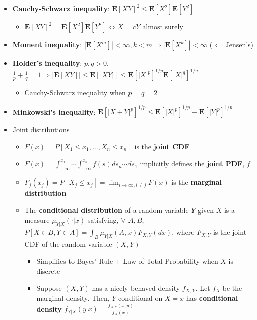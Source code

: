 \documentclass[12pt,english]{article}
\begin{document}
\begin{itemize}
	\item \textbf{Cauchy-Schwarz inequality}: $\mathbf{E}[XY]^{2} \leq \mathbf{E}[X^{2}] \mathbf{E}[Y^{2}]$ 
	\begin{itemize}
		\item $\mathbf{E}[XY]^{2} = \mathbf{E}[X^{2}] \mathbf{E}[Y^{2}] \Leftrightarrow X = cY \text{ almost surely}$
	\end{itemize}
	\item \textbf{Moment inequality}: $|\mathbf{E}[X^{m}]| < \infty, k < m \Rightarrow |\mathbf{E}[X^{k}]| < \infty$ ($\Leftarrow$ Jensen's)
	\item \textbf{Holder's inequality}: $p, q > 0$, $\frac{1}{p} + \frac{1}{q} = 1 \Rightarrow |\mathbf{E}[XY]| \leq \mathbf{E}[|XY|] \leq \mathbf{E}[|X|^{p}]^{1/p} \mathbf{E}[|X|^{q}]^{1/q}$
	\begin{itemize}
		\item Cauchy-Schwarz inequality when $p = q = 2$
	\end{itemize}
	\item \textbf{Minkowski's inequality}: $\mathbf{E}[|X + Y|^{p}]^{1/p} \leq \mathbf{E}[|X|^{p}]^{1/p} + \mathbf{E}[|Y|^{p}]^{1/p}$
	\item Joint distributions
	\begin{itemize}
		\item $F(x) = P[X_{1} \leq x_{1}, \ldots, X_{n} \leq x_{n}]$ is the \textbf{joint CDF}
		\item $F(x) = \int_{-\infty}^{x_{1}} \cdots \int_{-\infty}^{x_{n}} f(s) ds_{n} \cdots ds_{1}$ implicitly defines the \textbf{joint PDF}, $f$
		\item $F_{j}(x_{j}) = P[X_{j} \leq x_{j}] = \displaystyle\lim_{i \to \infty, i \neq j} F(x)$ is the \textbf{marginal distribution}
		\item The \textbf{conditional distribution} of a random variable $Y$ given $X$ is a measure $\mu_{Y|X}(\cdot|x)$ satisfying, $\forall$ $A, B$, $P[X \in B, Y \in A] = \int_{B} \mu_{Y | X}(A, x) F_{X, Y}(dx)$, where $F_{X, Y}$ is the joint CDF of the random variable $(X, Y)$
		\begin{itemize}
			\item Simplifies to Bayes' Rule + Law of Total Probability when $X$ is discrete
			\item Suppose $(X, Y)$ has a nicely behaved density $f_{X, Y}$. Let $f_{X}$ be the marginal density. Then, $Y$ conditional on $X = x$ has \textbf{conditional density} $f_{Y | X}(y | x) = \frac{f_{X,Y}(x, y)}{f_{X}(x)}$

\end{itemize}
\end{itemize}
\end{itemize}
\end{document}
